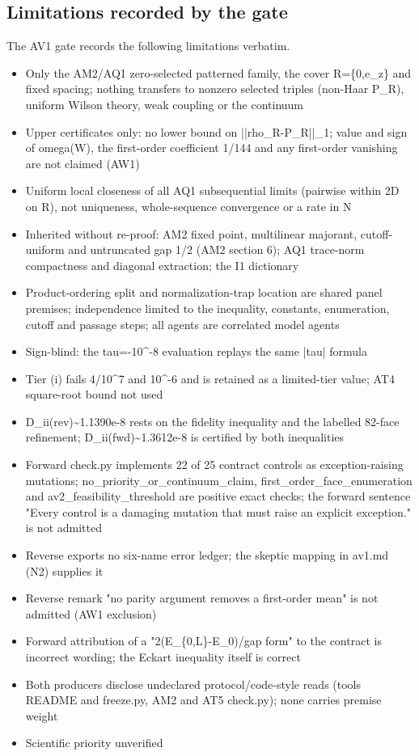 \subsection{Limitations recorded by the gate}
\label{sec:av1-limits}
The AV1 gate records the following limitations verbatim.
\begin{gatequote}
\begin{itemize}
\item Only the AM2/AQ1 zero-selected patterned family, the cover R=\{0,e\_z\}
and fixed spacing; nothing transfers to nonzero selected triples (non-Haar
P\_R), uniform Wilson theory, weak coupling or the continuum
\item Upper certificates only: no lower bound on ||rho\_R-P\_R||\_1; value and
sign of omega(W), the first-order coefficient 1/144 and any first-order
vanishing are not claimed (AW1)
\item Uniform local closeness of all AQ1 subsequential limits (pairwise within
2D on R), not uniqueness, whole-sequence convergence or a rate in N
\item Inherited without re-proof: AM2 fixed point, multilinear majorant,
cutoff-uniform and untruncated gap 1/2 (AM2 section 6); AQ1 trace-norm
compactness and diagonal extraction; the I1 dictionary
\item Product-ordering split and normalization-trap location are shared panel
premises; independence limited to the inequality, constants, enumeration,
cutoff and passage steps; all agents are correlated model agents
\item Sign-blind: the tau=-10\textasciicircum{}-8 evaluation replays the same
|tau| formula
\item Tier (i) fails 4/10\textasciicircum{}7 and 10\textasciicircum{}-6 and is
retained as a limited-tier value; AT4 square-root bound not used
\item D\_ii(rev)\textasciitilde{}1.1390e-8 rests on the fidelity inequality
and the labelled 82-face refinement; D\_ii(fwd)\textasciitilde{}1.3612e-8 is
certified by both inequalities
\item Forward check.py implements 22 of 25 contract controls as
exception-raising mutations; no\_priority\_or\_continuum\_claim,
first\_order\_face\_enumeration and av2\_feasibility\_threshold are positive
exact checks; the forward sentence "Every control is a damaging mutation that
must raise an explicit exception." is not admitted
\item Reverse exports no six-name error ledger; the skeptic mapping in av1.md
(N2) supplies it
\item Reverse remark "no parity argument removes a first-order mean" is not
admitted (AW1 exclusion)
\item Forward attribution of a "2(E\_\{0,L\}-E\_0)/gap form" to the contract
is incorrect wording; the Eckart inequality itself is correct
\item Both producers disclose undeclared protocol/code-style reads (tools
README and freeze.py, AM2 and AT5 check.py); none carries premise weight
\item Scientific priority unverified
\end{itemize}
\end{gatequote}
